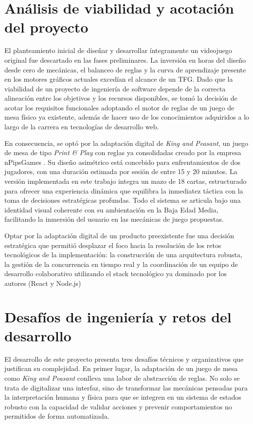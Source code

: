 \section{Análisis de viabilidad y acotación del proyecto}

El planteamiento inicial de diseñar y desarrollar íntegramente un videojuego original fue descartado en las fases preliminares. La inversión en horas del diseño desde cero de mecánicas, el balanceo de reglas y la curva de aprendizaje presente en los motores gráficos actuales  excedían el alcance de un TFG. Dado que la viabilidad de un proyecto de ingeniería de software depende de la correcta alineación entre los objetivos y los recursos disponibles, se tomó la decisión de acotar los requisitos funcionales adoptando el motor de reglas de un juego de mesa físico ya existente, además de hacer uso de los conocimientos adquiridos a lo largo de la carrera en tecnologías de desarrollo web. 

En consecuencia, se optó por la adaptación digital de \textit{King and Peasant}, un juego de mesa de tipo \textit{Print \& Play} con reglas ya consolidadas creado por la empresa nPipsGames \cite{npips_king_peasant}. Su diseño asimétrico está concebido para enfrentamientos de dos jugadores, con una duración estimada por sesión de entre 15 y 20 minutos. La versión implementada en este trabajo integra un mazo de 18 cartas, estructurado para ofrecer una experiencia dinámica que equilibra la inmediatez táctica con la toma de decisiones estratégicas profundas. Todo el sistema se articula bajo una identidad visual coherente con su ambientación en la Baja Edad Media, facilitando la inmersión del usuario en las mecánicas de juego propuestas. 

Optar por la adaptación digital de un producto preexistente fue una decisión estratégica que permitió desplazar el foco hacia la resolución de los retos tecnológicos de la implementación: la construcción de una arquitectura robusta, la gestión de la concurrencia en tiempo real y la coordinación de un equipo de desarrollo colaborativo utilizando el stack tecnológico ya dominado por los autores (React y Node.js)

\section{Desafíos de ingeniería y retos del desarrollo}

El desarrollo de este proyecto presenta tres desafíos técnicos y organizativos que justifican su complejidad. En primer lugar, la adaptación de un juego de mesa como \textit{King and Peasant} conlleva una labor de abstracción de reglas. No solo se trata de digitalizar una interfaz, sino de transformar las mecánicas pensadas para la interpretación humana y física para que se integren en un sistema de estados robusto con la capacidad de validar acciones y prevenir comportamientos no permitidos de forma automatizada.


